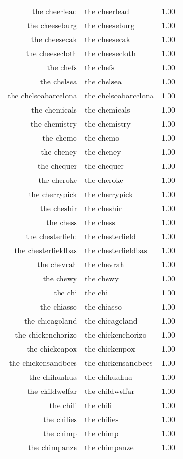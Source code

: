 \begin{table}[ht]
\begin{tabular}{rlr}
  the cheerlead & the cheerlead & 1.00 \\ 
  the cheeseburg & the cheeseburg & 1.00 \\ 
  the cheesecak & the cheesecak & 1.00 \\ 
  the cheesecloth & the cheesecloth & 1.00 \\ 
  the chefs & the chefs & 1.00 \\ 
  the chelsea & the chelsea & 1.00 \\ 
  the chelseabarcelona & the chelseabarcelona & 1.00 \\ 
  the chemicals & the chemicals & 1.00 \\ 
  the chemistry & the chemistry & 1.00 \\ 
  the chemo & the chemo & 1.00 \\ 
  the cheney & the cheney & 1.00 \\ 
  the chequer & the chequer & 1.00 \\ 
  the cheroke & the cheroke & 1.00 \\ 
  the cherrypick & the cherrypick & 1.00 \\ 
  the cheshir & the cheshir & 1.00 \\ 
  the chess & the chess & 1.00 \\ 
  the chesterfield & the chesterfield & 1.00 \\ 
  the chesterfieldbas & the chesterfieldbas & 1.00 \\ 
  the chevrah & the chevrah & 1.00 \\ 
  the chewy & the chewy & 1.00 \\ 
  the chi & the chi & 1.00 \\ 
  the chiasso & the chiasso & 1.00 \\ 
  the chicagoland & the chicagoland & 1.00 \\ 
  the chickenchorizo & the chickenchorizo & 1.00 \\ 
  the chickenpox & the chickenpox & 1.00 \\ 
  the chickensandbees & the chickensandbees & 1.00 \\ 
  the chihuahua & the chihuahua & 1.00 \\ 
  the childwelfar & the childwelfar & 1.00 \\ 
  the chili & the chili & 1.00 \\ 
  the chilies & the chilies & 1.00 \\ 
  the chimp & the chimp & 1.00 \\ 
  the chimpanze & the chimpanze & 1.00 \\ 

\end{tabular}
\end{table}
